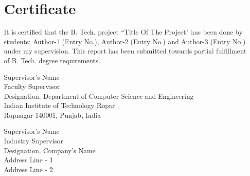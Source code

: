 \chapter*{Certificate}
It is certified that the B. Tech. project ``Title Of The Project" has been done by students: Author-1 (Entry No.), Author-2 (Entry No.) and Author-3 (Entry No.) under my supervision. This report has been submitted towards partial fulfillment of B. Tech. degree requirements. \\
\vspace*{15mm}

\begin{flushright}
Supervisor's Name \\
Faculty Supervisor \\
Designation, Department of Computer Science and Engineering \\
Indian Institute of Technology Ropar \\
Rupnagar-140001, Punjab, India \\
\end{flushright}

\vspace*{15mm}

\begin{flushright}
Supervisor's Name \\
Industry Supervisor \\
Designation, Company's Name \\
Address Line - 1 \\
Address Line - 2 \\
\end{flushright}

